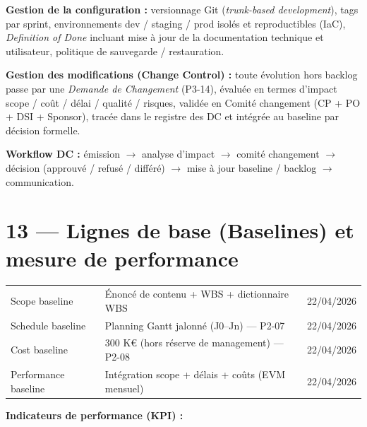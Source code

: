 \documentclass[11pt,a4paper,oneside]{report}
\begin{document}
\textbf{Gestion de la configuration :} versionnage Git (\textit{trunk-based development}),
tags par sprint, environnements dev / staging / prod isolés et reproductibles (IaC),
\textit{Definition of Done} incluant mise à jour de la documentation technique et
utilisateur, politique de sauvegarde / restauration.

\textbf{Gestion des modifications (Change Control) :} toute évolution hors backlog passe
par une \textit{Demande de Changement} (P3-14), évaluée en termes d'impact scope / coût /
délai / qualité / risques, validée en Comité changement (CP + PO + DSI + Sponsor), tracée
dans le registre des DC et intégrée au baseline par décision formelle.

\textbf{Workflow DC :} émission $\rightarrow$ analyse d'impact $\rightarrow$ comité changement
$\rightarrow$ décision (approuvé / refusé / différé) $\rightarrow$ mise à jour baseline /
backlog $\rightarrow$ communication.

\section*{13 — Lignes de base (Baselines) et mesure de performance}

\renewcommand{\arraystretch}{1.3}
\begin{tabularx}{\textwidth}{L{4cm} Y C{3cm}}
\toprule
{} &  &  \\
\midrule
Scope baseline       & Énoncé de contenu + WBS + dictionnaire WBS            & 22/04/2026 \\
Schedule baseline    & Planning Gantt jalonné (J0–Jn) — P2-07                & 22/04/2026 \\
Cost baseline        & 300 K€ (hors réserve de management) — P2-08           & 22/04/2026 \\
Performance baseline & Intégration scope + délais + coûts (EVM mensuel)      & 22/04/2026 \\
\bottomrule
\end{tabularx}

\vspace{4pt}
\textbf{Indicateurs de performance (KPI) :}
\end{document}
